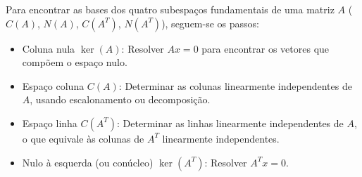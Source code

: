 \begin{resolution}
  Para encontrar as bases dos quatro subespaços fundamentais de uma matriz \( A \) (\( C(A) \), \( N(A) \), \( C(A^T) \), \( N(A^T) \)), seguem-se os passos:

  \begin{itemize}
    \item Coluna nula \( \operatorname{ker}(A) \): Resolver \( A x = 0 \) para encontrar os vetores que compõem o espaço nulo.
    \item Espaço coluna \( C(A) \): Determinar as colunas linearmente independentes de \( A \), usando escalonamento ou decomposição.
    \item Espaço linha \( C(A^T) \): Determinar as linhas linearmente independentes de \( A \), o que equivale às colunas de \( A^T \) linearmente independentes.
    \item Nulo à esquerda (ou conúcleo) \( \operatorname{ker}(A^T) \): Resolver \( A^T x = 0 \).
  \end{itemize}


  \begin{enumerate}[label=\alph*)]



\end{enumerate}
\end{resolution}
